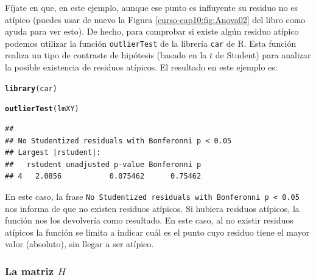 \documentclass[10pt,a4paper]{article}\usepackage[]{graphicx}\usepackage[]{color}
\makeatletter
\newcommand{\hlstd}[1]{\textcolor[rgb]{0.345,0.345,0.345}{#1}}%
\newcommand{\hlkwd}[1]{\textcolor[rgb]{0.737,0.353,0.396}{\textbf{#1}}}%
\newenvironment{kframe}{%
 \def\at@end@of@kframe{}%
 \ifinner\ifhmode%
  \def\at@end@of@kframe{\end{minipage}}%
  \begin{minipage}{\columnwidth}%
 \fi\fi%
 \def\FrameCommand##1{\hskip\@totalleftmargin \hskip-\fboxsep
 \colorbox{shadecolor}{##1}\hskip-\fboxsep
     \hskip-\linewidth \hskip-\@totalleftmargin \hskip\columnwidth}%
 \MakeFramed {\advance\hsize-\width
   \@totalleftmargin\z@ \linewidth\hsize
   \@setminipage}}%
 {\par\unskip\endMakeFramed%
 \at@end@of@kframe}
\newenvironment{knitrout}{}{} %
\newcounter {cont01}
\makeatother
\begin{document}
Fíjate en que, en este ejemplo, aunque ese punto es influyente su residuo no es atípico (puedes usar de nuevo la Figura \ref{curso-cap10:fig:Anova02} del libro como ayuda para ver esto).  De hecho, para comprobar si existe algún residuo atípico podemos utilizar la función {\tt outlierTest} de la librería {\tt car} de R.  Esta función realiza un tipo de contraste de hipótesis (basado en la $t$ de Student) para analizar la posible existencia de residuos atípicos. El resultado en este ejemplo es:
\begin{knitrout}
\color{fgcolor}\begin{kframe}
\begin{alltt}
\hlkwd{library}\hlstd{(car)}
\end{alltt}


{\ttfamily\noindent\color{warningcolor}{\#\# Warning: package 'car' was built under R version 3.3.2}}

{\ttfamily\noindent\itshape\color{messagecolor}{\#\# \\\#\# Attaching package: 'car'}}

{\ttfamily\noindent\itshape\color{messagecolor}{\#\# The following objects are masked from 'package:BSDA':\\\#\# \\\#\#\ \ \ \  Vocab, Wool}}

{\ttfamily\noindent\itshape\color{messagecolor}{\#\# The following object is masked from 'package:gtools':\\\#\# \\\#\#\ \ \ \  logit}}\begin{alltt}
\hlkwd{outlierTest}\hlstd{(lmXY)}
\end{alltt}
\begin{verbatim}
## 
## No Studentized residuals with Bonferonni p < 0.05
## Largest |rstudent|:
##   rstudent unadjusted p-value Bonferonni p
## 4   2.0856           0.075462      0.75462
\end{verbatim}
\end{kframe}
\end{knitrout}
En este caso, la frase {\tt No Studentized residuals with Bonferonni p < 0.05} nos informa de que no existen residuos atípicos. Si hubiera residuos atípicos, la función nos los devolvería como resultado. En este caso, al no existir residuos atípicos la función se limita a indicar cuál es el punto cuyo residuo tiene el mayor valor (absoluto), sin llegar a ser atípico.

\subsubsection*{La matriz $H$}
\end{document}
